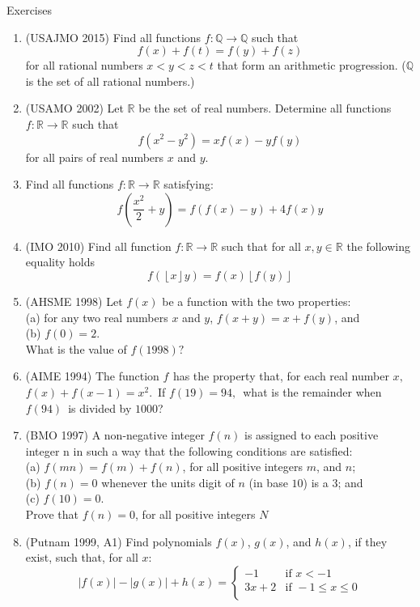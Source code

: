 \begin{xcb}{Exercises}
\begin{enumerate}
\item (USAJMO 2015) Find all functions $f:\mathbb{Q}\rightarrow\mathbb{Q}$ such that\[f(x)+f(t)=f(y)+f(z)\]for all rational numbers $x<y<z<t$ that form an arithmetic progression. ($\mathbb{Q}$ is the set of all rational numbers.)
\item (USAMO 2002) Let $\mathbb{R}$ be the set of real numbers. Determine all functions $f : \mathbb{R} \rightarrow \mathbb{R}$ such that \[f(x^2 - y^2) = xf(x) - yf(y)\] for all pairs of real numbers $x$ and $y$.
\item Find all functions $f: \mathbb{R} \to \mathbb{R}$ satisfying: \[ f\left(\frac{x^2}{2} + y\right) = f\left(f(x) - y\right) + 4f(x)y \]
\item (IMO 2010) Find all function $f:\mathbb{R}\rightarrow\mathbb{R}$ such that for all $x,y\in\mathbb{R}$ the following equality holds
\[f(\left\lfloor x\right\rfloor y)=f(x)\left\lfloor f(y)\right\rfloor\]
\item (AHSME 1998) Let $f(x)$ be a function with the two properties:\\
(a) for any two real numbers $x$ and $y$, $f(x+y) = x + f(y)$, and\\
(b) $f(0) = 2.$\\
What is the value of $f(1998)?$
\item (AIME 1994) The function $f_{}^{}$ has the property that, for each real number $x,\,$
$f(x)+f(x-1) = x^2.\,$
If $f(19)=94,\,$ what is the remainder when $f(94)\,$ is divided by $1000$?
\item (BMO 1997) A non-negative integer $f(n)$ is assigned to each positive integer n in such a way that the following conditions are satisfied:\\
(a) $f(mn) = f (m) + f (n)$, for all positive integers $m$, and $n$;\\
(b) $f (n) = 0$ whenever the units digit of $n$ (in base $10$) is a $3$; and\\
(c) $f (10) = 0$.\\
Prove that $f (n) = 0$, for all positive integers $N$
\item (Putnam 1999, A1) Find polynomials $f(x)$, $g(x)$, and $h(x)$, if they exist, such that, for all $x$:
\[
|f(x)|-|g(x)|+h(x) =
\begin{cases}
    -1 & \text{if } x < -1 \\
    3x + 2 & \text{if } -1 \leq x \leq 0 \\

\end{cases}\]
\end{enumerate}
\end{xcb}
